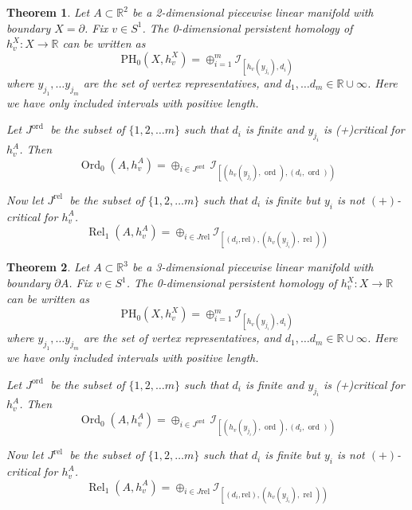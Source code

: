 \documentclass[a4paper]{article}
\theoremstyle{theorem}
\newtheorem{theorem}{Theorem}[section]
\theoremstyle{definition}
\theoremstyle{remark}
\theoremstyle{gremark}
\theoremstyle{discussion}
\theoremstyle{notation}
\begin{document}
	
	
	\begin{theorem}
		Let $A \subset \mathbb{R}^2$ be a 2-dimensional piecewise linear manifold with boundary $X=\partial$. Fix $v \in S^1$. The 0-dimensional persistent homology of $h_v^X: X \rightarrow \mathbb{R}$ can be written as
		$$
		\mathrm{PH}_0\left(X, h_v^X\right)=\oplus_{i=1}^m \mathcal{I}_{\left[h_v\left(y_{j_i}\right), d_i\right)}
		$$
		where $y_{j_1}, \ldots y_{j_m}$ are the set of vertex representatives, and $d_1, \ldots d_m \in \mathbb{R} \cup \infty$. Here we have only included intervals with positive length.
		
		Let $J^{\text {ord }}$ be the subset of $\{1,2, \ldots m\}$ such that $d_i$ is finite and $y_{j_i}$ is (+)critical for $h_v^A$. Then
		$$
		\operatorname{Ord}_0\left(A, h_v^A\right)=\oplus_{i \in J^{\text {ord }}} \mathcal{I}_{\left[\left(h_v\left(y_{j_i}\right), \text { ord }\right),\left(d_i, \text { ord }\right)\right)}
		$$
		
		Now let $J^{\text {rel }}$ be the subset of $\{1,2, \ldots m\}$ such that $d_i$ is finite but $y_i$ is not $(+)$-critical for $h_v^A$.
		$$
		\operatorname{Rel}_1\left(A, h_v^A\right)=\oplus_{i \in J \mathrm{rel}} \mathcal{I}_{\left[\left(d_i, \mathrm{rel}\right),\left(h_v\left(y_{j_i}\right), \text { rel }\right)\right)}
		$$
	\end{theorem}
	
	\begin{theorem}
			Let $A \subset \mathbb{R}^3$ be a 3-dimensional piecewise linear manifold with boundary $\partial A$. Fix $v \in S^1$. The 0-dimensional persistent homology of $h_v^X: X \rightarrow \mathbb{R}$ can be written as
		$$
		\mathrm{PH}_0\left(X, h_v^X\right)=\oplus_{i=1}^m \mathcal{I}_{\left[h_v\left(y_{j_i}\right), d_i\right)}
		$$
		where $y_{j_1}, \ldots y_{j_m}$ are the set of vertex representatives, and $d_1, \ldots d_m \in \mathbb{R} \cup \infty$. Here we have only included intervals with positive length.
		
		Let $J^{\text {ord }}$ be the subset of $\{1,2, \ldots m\}$ such that $d_i$ is finite and $y_{j_i}$ is (+)critical for $h_v^A$. Then
		$$
		\operatorname{Ord}_0\left(A, h_v^A\right)=\oplus_{i \in J^{\text {ord }}} \mathcal{I}_{\left[\left(h_v\left(y_{j_i}\right), \text { ord }\right),\left(d_i, \text { ord }\right)\right)}
		$$
		
		Now let $J^{\text {rel }}$ be the subset of $\{1,2, \ldots m\}$ such that $d_i$ is finite but $y_i$ is not $(+)$-critical for $h_v^A$.
		$$
		\operatorname{Rel}_1\left(A, h_v^A\right)=\oplus_{i \in J \mathrm{rel}} \mathcal{I}_{\left[\left(d_i, \mathrm{rel}\right),\left(h_v\left(y_{j_i}\right), \text { rel }\right)\right)}
		$$
	\end{theorem}
\end{document}
